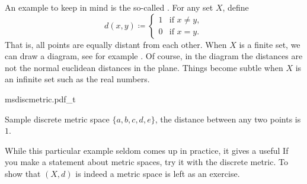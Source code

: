 \begin{example}
An example to keep in mind is the so-called
\emph{}.
For any set $X$, define
\begin{equation*}
d(x,y) \coloneqq
\begin{cases}
1 & \text{if } x \not= y, \\
0 & \text{if } x = y.
\end{cases}
\end{equation*}
That is, all points are equally distant from each other.  When $X$ is a
finite set, we can draw a diagram, see for example
.  Of course, in the diagram the distances 
are not the normal euclidean distances in the plane.
Things become subtle when $X$ is an infinite set such
as the real numbers.
\begin{myfigureht}
{msdiscmetric.pdf_t}
\caption{Sample discrete metric space $\{ a,b,c,d,e \}$, the distance
between any two points is $1$.\label{fig:msdiscmetric}}
\end{myfigureht}

While this particular
example seldom comes up in practice, it gives a useful 
  If you make a statement about metric spaces,
try it with the discrete metric.
To show that $(X,d)$ is indeed a metric space is left as an exercise.
\end{example}

